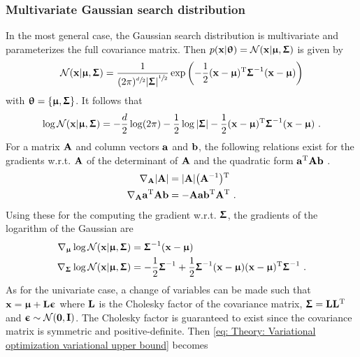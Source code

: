 \subsubsection{Multivariate Gaussian search distribution}\label{sec: Theory: Variational optimization: Multivariate Gaussian search distribution}
In the most general case, the Gaussian search distribution is multivariate and parameterizes the full covariance matrix. Then $p(\x|\thetab)=\mathcal{N}(\x|\mub,\Sigmab)$ is given by
\begin{equation}\label{eq: Theory: Variational optimization multivariate Gaussian PDF}
    \mathcal{N}(\x|\mub,\Sigmab) = \frac{1}{(2\pi)^{\sfrac{d}{2}}\size{\Sigmab}^{\sfrac{1}{2}}}\exp\pa{-\frac{1}{2}(\x-\mub)\transpose\Sigmab^{-1}(\x-\mub)}
\end{equation}
with $\thetab = \{\mub, \Sigmab\}$. It follows that
\begin{equation}\label{eq: Theory: Variational optimization multivariate Gaussian log PDF}
    \log\mathcal{N}(\x|\mub,\Sigmab) = -\frac{d}{2}\log(2\pi) - \frac{1}{2}\log\size{\Sigmab} -  \frac{1}{2}(\x-\mub)\transpose\Sigmab^{-1}(\x-\mub) \ .
\end{equation}
For a matrix $\A$ and column vectors $\a$ and $\b$, the following relations exist for the gradients w.r.t. $\A$ of the determinant of $\A$ and the quadratic form $\a\transpose\A\b$ \cite[(49) and (61)]{Petersen2012}.
\begin{align*}
    \nabla_\A \size{\A} &= \size{\A}\pa{\A^{-1}}\transpose\\
    \nabla_\A \a\transpose\A\b &= -\A\a\b\transpose\A\transpose \ .
\end{align*}
Using these for the computing the gradient w.r.t. $\Sigmab$, the gradients of the logarithm of the Gaussian are
\begin{align}
    \nabla_\mub\log\mathcal{N}(\x|\mub,\Sigmab)
    &= \Sigmab^{-1}(\x-\mub)\\
    \nabla_\Sigmab\log\mathcal{N}(\x|\mub,\Sigmab)
    &= -\frac{1}{2}\Sigmab^{-1} + \frac{1}{2}\Sigmab^{-1}(\x-\mub)(\x-\mub)\transpose\Sigmab^{-1} \ .
\end{align}
As for the univariate case, a change of variables can be made such that $\x=\mub+\L\epsilonb$ where $\L$ is the Cholesky factor of the covariance matrix, $\Sigmab=\L\L\transpose$ and $\epsilonb\sim\mathcal{N}(\0,\I)$. The Cholesky factor is guaranteed to exist since the covariance matrix is symmetric and positive-definite. Then \eqref{eq: Theory: Variational optimization variational upper bound} becomes
